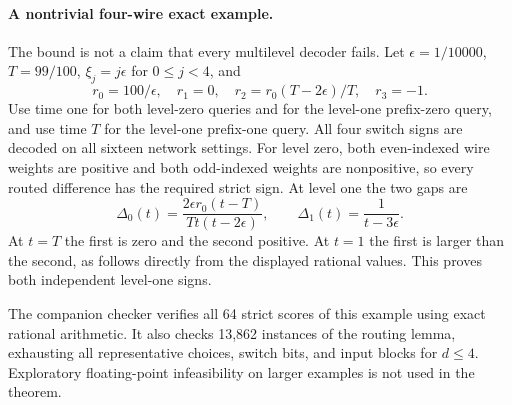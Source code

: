 \documentclass[11pt]{article}
\begin{document}
\paragraph{A nontrivial four-wire exact example.}
The bound is not a claim that every multilevel decoder fails. Let
$\epsilon=1/10000$, $T=99/100$, $\xi_j=j\epsilon$ for $0\leq j<4$, and
\[
 r_0=100/\epsilon,\quad r_1=0,\quad
 r_2=r_0(T-2\epsilon)/T,\quad r_3=-1.
\]
Use time one for both level-zero queries and for the level-one prefix-zero
query, and use time $T$ for the level-one prefix-one query. All four
switch signs are decoded on all sixteen network settings.
For level zero, both even-indexed wire weights are positive and both
odd-indexed weights are nonpositive, so every routed difference has the
required strict sign. At level one the two gaps are
\[
 \Delta_0(t)=\frac{2\epsilon r_0(t-T)}{Tt(t-2\epsilon)},
 \qquad \Delta_1(t)=\frac1{t-3\epsilon}.
\]
At $t=T$ the first is zero and the second positive. At $t=1$ the first
is larger than the second, as follows directly from the displayed
rational values. This proves both independent level-one signs.

The companion checker verifies all 64 strict scores of this example
using exact rational arithmetic. It also checks 13,862 instances of the
routing lemma, exhausting all representative choices, switch bits, and
input blocks for $d\leq4$. Exploratory floating-point infeasibility on
larger examples is not used in the theorem.
\end{document}
